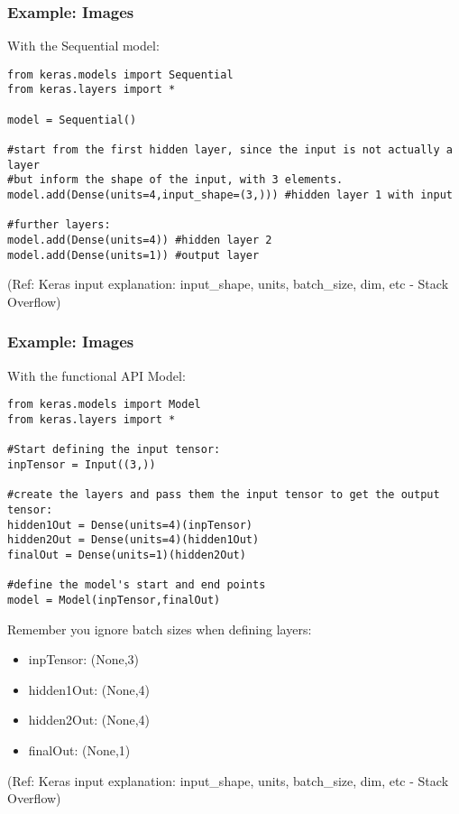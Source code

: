 \begin{frame}[fragile] \frametitle{Example: Images}

With the Sequential model:

\begin{lstlisting}
from keras.models import Sequential  
from keras.layers import *  

model = Sequential()    

#start from the first hidden layer, since the input is not actually a layer   
#but inform the shape of the input, with 3 elements.    
model.add(Dense(units=4,input_shape=(3,))) #hidden layer 1 with input

#further layers:    
model.add(Dense(units=4)) #hidden layer 2
model.add(Dense(units=1)) #output layer   
\end{lstlisting}

\tiny{(Ref: Keras input explanation: input\_shape, units, batch\_size, dim, etc - Stack Overflow)}
\end{frame}

\begin{frame}[fragile] \frametitle{Example: Images}

With the functional API Model:

\begin{lstlisting}
from keras.models import Model   
from keras.layers import * 

#Start defining the input tensor:
inpTensor = Input((3,))   

#create the layers and pass them the input tensor to get the output tensor:    
hidden1Out = Dense(units=4)(inpTensor)    
hidden2Out = Dense(units=4)(hidden1Out)    
finalOut = Dense(units=1)(hidden2Out)   

#define the model's start and end points    
model = Model(inpTensor,finalOut)  
\end{lstlisting}

Remember you ignore batch sizes when defining layers:

\begin{itemize}
\item  inpTensor: (None,3)
\item  hidden1Out: (None,4)
\item  hidden2Out: (None,4)
\item  finalOut: (None,1)
\end{itemize}


\tiny{(Ref: Keras input explanation: input\_shape, units, batch\_size, dim, etc - Stack Overflow)}
\end{frame}



